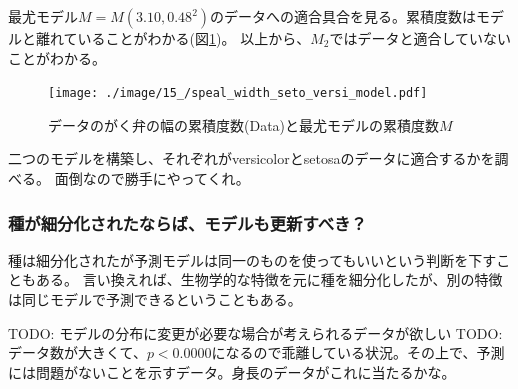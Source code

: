 最尤モデル$M=M(3.10,0.48^2)$のデータへの適合具合を見る。累積度数はモデルと離れていることがわかる(図\ref{fig:speal_width_setosa_versi_model})。
以上から、$M_2$ではデータと適合していないことがわかる。


\begin{figure}
    \begin{center}
        \texttt{[image: ./image/15\_/speal\_width\_seto\_versi\_model.pdf]}
        \caption{データのがく弁の幅の累積度数(Data)と最尤モデルの累積度数$M$}
        \label{fig:speal_width_setosa_versi_model}
    \end{center}
\end{figure}


二つのモデルを構築し、それぞれがversicolorとsetosaのデータに適合するかを調べる。
面倒なので勝手にやってくれ。


\subsubsection{種が細分化されたならば、モデルも更新すべき？}
種は細分化されたが予測モデルは同一のものを使ってもいいという判断を下すこともある。
言い換えれば、生物学的な特徴を元に種を細分化したが、別の特徴は同じモデルで予測できるということもある。




TODO: モデルの分布に変更が必要な場合が考えられるデータが欲しい
TODO: データ数が大きくて、$p<0.0000$になるので乖離している状況。その上で、予測には問題がないことを示すデータ。身長のデータがこれに当たるかな。
\fi

